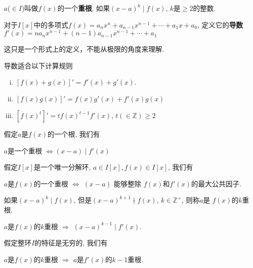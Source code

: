 \begin{Definition}[重根]
$a$\;($\in I$)叫做$f(x)$的一个\textbf{重根}, 如果$(x - a)^k \mid f(x)$, $k$是$\ge 2$的整数.
\end{Definition}

\begin{Definition}[导数]
对于$I[x]$中的多项式$f(x) = a_n x^n +a_{n-1} x^{n-1} + \cdots +a_1 x +a_0$,
定义它的\textbf{导数}$f'(x) = n a_n x^{n-1} + (n-1) a_{n-1} x^{n-1} + \cdots + a_1$
\end{Definition}

\begin{Note}
这只是一个形式上的定义，不能从极限的角度来理解.
\end{Note}

\begin{Proposition}
导数适合以下计算规则
\begin{enumerate}[(i)]
	\item $[f(x) +g(x)]' = f'(x) + g'(x)$.
	\item $[f(x)g(x)]' = f(x) g'(x) +f'(x) g(x)$
	\item $[f(x)^t]' = t f(x)^{t-1}f'(x)$, $t (\in \mathbb{Z})\ge 2$
\end{enumerate}
\end{Proposition}

\begin{Theorem}
假定$a$是$f(x)$的一个根, 我们有 %
 \begin{tightcenter}{ $a$是一个重根 $\Leftrightarrow (x - a) \mid f'(x)$}
 \end{tightcenter}
\end{Theorem}

\begin{Corollary}
假定$I[x]$是一个唯一分解环, $a \in I[x], f(x) \in I[x]$, 我们有
\begin{tightcenter}
$a$是$f(x)$的一个重根 $\Leftrightarrow$ $(x - a)  $ 能够整除 $f(x)$和$f'(x)$的最大公共因子.
\end{tightcenter}
\end{Corollary}

\begin{Definition}
如果$(x-a)^k \mid f(x)$, 但是$(x-a)^{k+1} \nmid f(x)$, $k \in \mathbb{Z}^+$, 则称$a$是
$f(x)$的$k$重根.
\end{Definition}

\begin{Theorem}
$a$是$f(x)$的$k$重根 $\Rightarrow$ $(x-a)^{k-1} \mid f'(x)$.
\end{Theorem}

\begin{Theorem}
假定整环$I$的特征是无穷的, 我们有
\begin{tightcenter}
$a$是$f(x)$的$k$重根 $\Rightarrow$ $a$是$f'(x)$的$k-1$重根.
\end{tightcenter}
\end{Theorem}